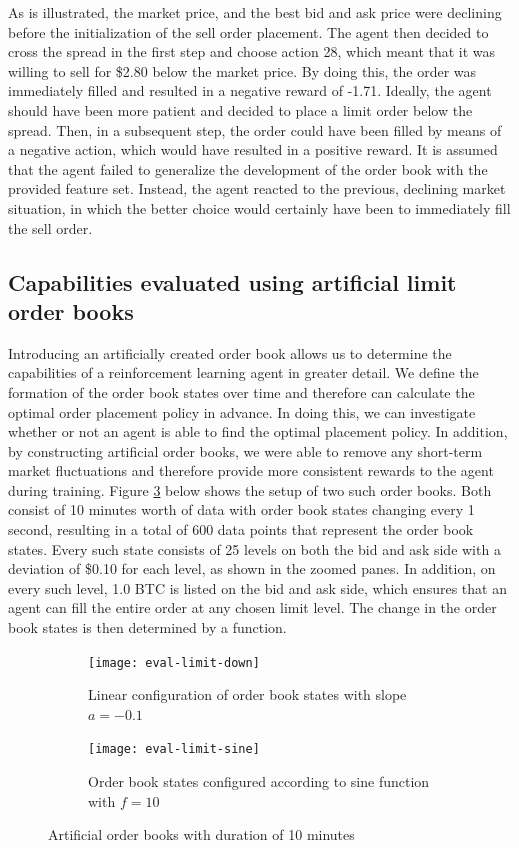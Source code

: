 As is illustrated, the market price, and the best bid and ask price were declining before the initialization of the sell order placement. 
The agent then decided to cross the spread in the first step and choose action 28, which meant that it was willing to sell for \$2.80 below the market price.
By doing this, the order was immediately filled and resulted in a negative reward of -1.71.
Ideally, the agent should have been more patient and decided to place a limit order below the spread.
Then, in a subsequent step, the order could have been filled by means of a negative action, which would have resulted in a positive reward.
It is assumed that the agent failed to generalize the development of the order book with the provided feature set.
Instead, the agent reacted to the previous, declining market situation, in which  the better choice would certainly have been to immediately fill the sell order.

\subsection{Capabilities evaluated using artificial limit order books}

Introducing an artificially created order book allows us to determine the capabilities of a reinforcement learning agent in greater detail.
We define the formation of the order book states over time and therefore can calculate the optimal order placement policy in advance.
In doing this, we can investigate whether or not an agent is able to find the optimal placement policy.
In addition, by constructing artificial order books, we were able to remove any short-term market fluctuations and therefore provide more consistent rewards to the agent during training.
Figure \ref{fig:eval-limit-artificial} below shows the setup of two such order books.
Both consist of 10 minutes worth of data with order book states changing every 1 second, resulting in a total of 600 data points that represent the order book states.
Every such state consists of 25 levels on both the bid and ask side with a deviation of \$0.10 for each level, as shown in the zoomed panes.
In addition, on every such level, 1.0 BTC is listed on the bid and ask side, which ensures that an agent can fill the entire order at any chosen limit level.
The change in the order book states is then determined by a function.
\begin{figure}[H]
    \centering
    \begin{subfigure}[b]{0.45\textwidth}
        \texttt{[image: eval-limit-down]}
        \caption{Linear configuration of order book states with slope $a=-0.1$}
        \label{fig:eval-limit-down}
    \end{subfigure}
    \begin{subfigure}[b]{0.45\textwidth}
        \texttt{[image: eval-limit-sine]}
        \caption{Order book states configured according to sine function with $f=10$}
        \label{fig:eval-limit-sine}
    \end{subfigure}
    \caption{Artificial order books with duration of 10 minutes}\label{fig:eval-limit-artificial}
\end{figure}

